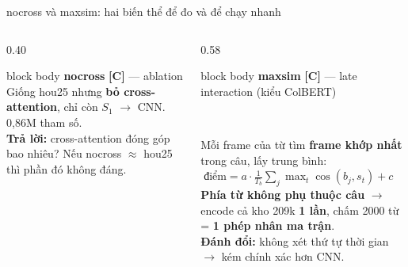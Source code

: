 \documentclass[aspectratio=169,xcolor=table]{beamer}
\newcommand{\hi}[1]{\textcolor{Primary}{\textbf{#1}}}
\newcommand{\bad}[1]{\textcolor{RiskRed}{\textbf{#1}}}
\newcommand{\good}[1]{\textcolor{GoodGreen}{\textbf{#1}}}
\begin{document}
\begin{frame}{nocross và maxsim: hai biến thể để đo và để chạy nhanh}
\begin{columns}[T]
\begin{column}{0.40\textwidth}
\begin{beamercolorbox}[sep=0.5em,rounded=true]{block body}
\small\textbf{nocross} \hi{[C]} --- ablation\\[2pt]
\footnotesize Giống hou25 nhưng \textbf{bỏ cross-attention}, chỉ còn $S_1$ $\rightarrow$ CNN.\\[3pt]
0,86M tham số.\\[3pt]
\textbf{Trả lời:} cross-attention đóng góp bao nhiêu? Nếu nocross $\approx$ hou25 thì phần đó không đáng.
\end{beamercolorbox}
\end{column}
\begin{column}{0.58\textwidth}
\begin{beamercolorbox}[sep=0.5em,rounded=true]{block body}
\small\textbf{maxsim} \hi{[C]} --- late interaction (kiểu ColBERT)\\[2pt]
\centering
{}\\[2pt]
\raggedright\footnotesize
Mỗi frame của từ tìm \textbf{frame khớp nhất} trong câu, lấy trung bình: $\;\text{điểm}=a\cdot\frac{1}{T_b}\sum_j \max_t \cos(b_j,s_t)+c$\\[3pt]
\good{Phía từ không phụ thuộc câu} $\rightarrow$ encode cả kho 209k \textbf{1 lần}, chấm 2000 từ = \textbf{1 phép nhân ma trận}.\\
\bad{Đánh đổi:} không xét thứ tự thời gian $\rightarrow$ kém chính xác hơn CNN.
\end{beamercolorbox}
\end{column}
\end{columns}
\end{frame}
\end{document}

